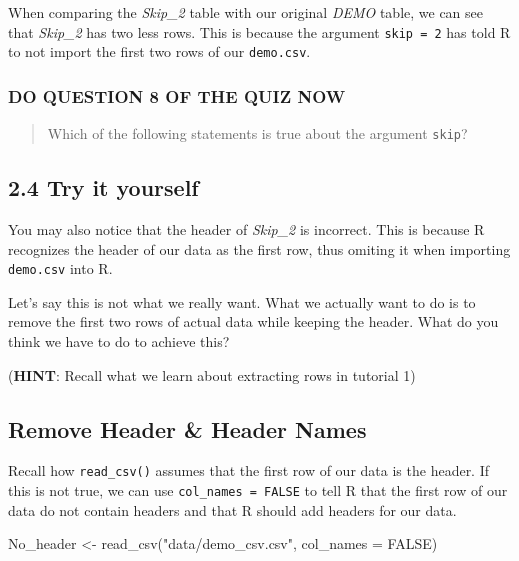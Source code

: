 \documentclass[
]{book}
\newenvironment{Shaded}{\begin{snugshade}}{\end{snugshade}}
\newcommand{\AttributeTok}[1]{\textcolor[rgb]{0.77,0.63,0.00}{#1}}
\newcommand{\ConstantTok}[1]{\textcolor[rgb]{0.00,0.00,0.00}{#1}}
\newcommand{\FunctionTok}[1]{\textcolor[rgb]{0.00,0.00,0.00}{#1}}
\newcommand{\NormalTok}[1]{#1}
\newcommand{\OtherTok}[1]{\textcolor[rgb]{0.56,0.35,0.01}{#1}}
\newcommand{\StringTok}[1]{\textcolor[rgb]{0.31,0.60,0.02}{#1}}
\begin{document}
When comparing the \emph{Skip\_2} table with our original \emph{DEMO} table, we can see that \emph{Skip\_2} has two less rows. This is because the argument \texttt{skip\ =\ 2} has told R to not import the first two rows of our \texttt{demo.csv}.

\hypertarget{do-question-8-of-the-quiz-now-1}{%
\subsubsection{DO QUESTION 8 OF THE QUIZ NOW}\label{do-question-8-of-the-quiz-now-1}}

\begin{quote}
Which of the following statements is true about the argument \texttt{skip}?
\end{quote}

\hypertarget{try-it-yourself-12}{%
\subsection{2.4 Try it yourself}\label{try-it-yourself-12}}

You may also notice that the header of \emph{Skip\_2} is incorrect. This is because R recognizes the header of our data as the first row, thus omiting it when importing \texttt{demo.csv} into R.

Let's say this is not what we really want. What we actually want to do is to remove the first two rows of actual data while keeping the header. What do you think we have to do to achieve this?

(\textbf{HINT}: Recall what we learn about extracting rows in tutorial 1)

\hypertarget{remove-header-header-names}{%
\subsection{Remove Header \& Header Names}\label{remove-header-header-names}}

Recall how \texttt{read\_csv()} assumes that the first row of our data is the header. If this is not true, we can use \texttt{col\_names\ =\ FALSE} to tell R that the first row of our data do not contain headers and that R should add headers for our data.

\begin{Shaded}
\begin{Highlighting}[]
\NormalTok{No\_header }\OtherTok{\textless{}{-}} \FunctionTok{read\_csv}\NormalTok{(}\StringTok{"data/demo\_csv.csv"}\NormalTok{, }
                      \AttributeTok{col\_names =} \ConstantTok{FALSE}\NormalTok{)}
\end{Highlighting}
\end{Shaded}
\end{document}
